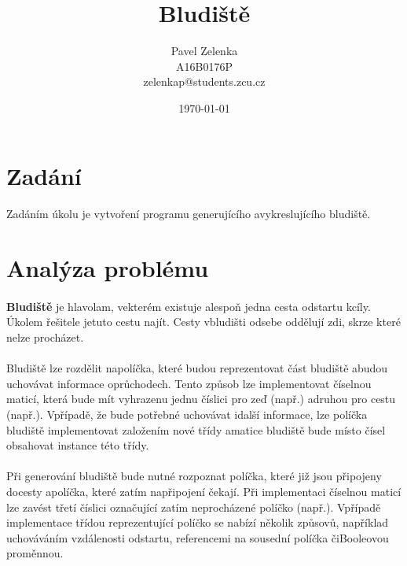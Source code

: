 \documentclass[12pt]{scrartcl}
\author{Pavel Zelenka\\A16B0176P\\zelenkap@students.zcu.cz}
\date{\today}
\title{Bludiště}
\begin{document}
\maketitle
{}
\newpage
{}
\newpage
\section{Zadání}
	
\paragraph{}
Zadáním úkolu je vytvoření programu generujícího a\nobreakspace vykreslujícího bludiště. 

\section{Analýza problému}

\paragraph{}
\textbf{Bludiště} je hlavolam, ve\nobreakspace kterém existuje alespoň jedna cesta od\nobreakspace startu k\nobreakspace cíly. Úkolem řešitele je\nobreakspace tuto cestu najít. Cesty v\nobreakspace bludišti od\nobreakspace sebe oddělují zdi, skrze které nelze procházet. 
\paragraph{}
Bludiště lze rozdělit na\nobreakspace políčka, které budou reprezentovat část bludiště a\nobreakspace budou uchovávat informace o\nobreakspace průchodech. Tento způsob lze implementovat číselnou maticí, která bude mít vyhrazenu jednu číslici pro zeď (např.) a\nobreakspace druhou pro cestu (např.). V\nobreakspace případě, že bude potřebné uchovávat i\nobreakspace další informace, lze políčka bludiště implementovat založením nové třídy a\nobreakspace matice bludiště bude místo čísel obsahovat instance této třídy. 
\paragraph{}
Při generování bludiště bude nutné rozpoznat políčka, které již jsou připojeny do\nobreakspace cesty a\nobreakspace políčka, které zatím na\nobreakspace připojení čekají. Při implementaci číselnou maticí lze zavést třetí číslici označující zatím neprocházené políčko (např.). V\nobreakspace případě implementace třídou reprezentující políčko se nabízí několik způsovů, například uchováváním vzdálenosti od\nobreakspace startu, referencemi na sousední políčka či\nobreakspace Booleovou proměnnou.
\end{document}
